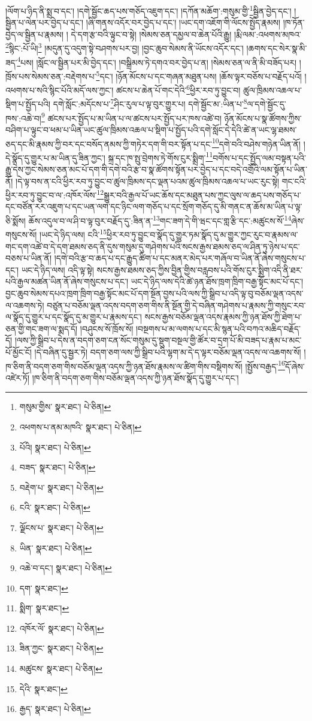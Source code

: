 །ལོག་པ་ཉིད་ནི་སྨྲ་བ་དང་། །དགེ་སྦྱོང་ཆད་པས་གཅོད་འཇུག་དང་། །དཀོན་མཆོག་:གསུམ་གྱི་\footnote{གསུམ་གྱིས་  སྣར་ཐང་།  པེ་ཅིན། }སྦྱིན་བྱེད་དང་། །སྦྱིན་པ་ལེན་པར་བྱེད་པ་དང་། །ཞི་གནས་འདོར་བར་བྱེད་པ་དང་། །ཡང་དག་འཇོག་གི་ལོངས་སྤྱོད་རྣམས། །ཁ་ཏོན་བྱེད་ལ་སྦྱིན་པ་རྣམས། །
དེ་དག་རྩ་བའི་ལྟུང་བ་སྟེ། །སེམས་ཅན་དམྱལ་བ་ཆེན་པོའི་རྒྱུ། །རྨི་ལམ་:འཕགས་མཁའ་\footnote{འཕགས་པ་ནམ་མཁའི་  སྣར་ཐང་།  པེ་ཅིན། }སྙིང་:པོ་ཡི།\footnote{པོའི།  སྣར་ཐང་།  པེ་ཅིན། } །མདུན་དུ་འདུག་སྟེ་བཤགས་པར་བྱ། །བྱང་ཆུབ་སེམས་ནི་ཡོངས་འདོར་དང་། །ཆགས་དང་སེར་སྣ་མི་ཟད་\footnote{བཟད་  སྣར་ཐང་།  པེ་ཅིན། }པས། །སློང་ལ་སྦྱིན་པར་མི་བྱེད་དང་། །བསྒྲིམས་ཏེ་དགའ་བར་བྱེད་པ་ན། །སེམས་ཅན་ལ་ནི་མི་བཟོད་པར། །ཁྲོས་པས་སེམས་ཅན་:བརྡེགས་པ་\footnote{བརྡེག་པ་  སྣར་ཐང་།  པེ་ཅིན། }དང་། །ཉོན་མོངས་པ་དང་གཞན་མཐུན་པས། །ཆོས་ལྟར་བཅོས་པ་བརྗོད་པའོ། །འཕགས་པ་སའི་སྙིང་པོའི་མདོ་ལས་ཀྱང་། ཚངས་པ་ཆེན་པོ་གང་དེའི་\footnote{ངའི་  སྣར་ཐང་།  པེ་ཅིན། }ཕྱིར་རབ་ཏུ་བྱུང་བ། ཚུལ་ཁྲིམས་འཆལ་པ་སྡིག་པ་སྤྱོད་པའི། དགེ་སློང་:མདོངས་པ་\footnote{ལྗོངས་པ་  སྣར་ཐང་།  པེ་ཅིན། }ཤིང་རུལ་པ་ལྟ་བུར་གྱུར་པ། དགེ་སྦྱོང་མ་:ཡིན་པ་\footnote{ཡིན་  སྣར་ཐང་།  པེ་ཅིན། }ལ་དགེ་སྦྱོང་དུ་ཁས་:འཆེ་བ།\footnote{འཆེ་བ་དང་།  སྣར་ཐང་།  པེ་ཅིན། } ཚངས་པར་སྤྱོད་པ་མ་ཡིན་པ་ལ་ཚངས་པར་སྤྱོད་པར་ཁས་འཚེ་བ། ཉོན་མོངས་པ་སྣ་ཚོགས་ཀྱིས་བཤིག་པ་ལྟུང་བ་ཕམ་པ་ཡིན་ཡང་ཚུལ་ཁྲིམས་འཆལ་པ་སྡིག་པ་སྤྱོད་པའི་དགེ་སློང་དེ་དེའི་ཚེ་ན་ཡང་ལྷ་ཐམས་ཅད་དང་མི་རྣམས་ཀྱི་བར་དང་བསོད་ནམས་ཀྱི་གཏེར་དག་གི་བར་སྟོན་པ་དང་\footnote{དག་  སྣར་ཐང་། }དགེ་བའི་བཤེས་གཉེན་ཡིན་ནོ། །དེ་སྣོད་དུ་གྱུར་པ་མ་ཡིན་དུ་ཟིན་ཀྱང་། སྐྲ་དང་ཁ་སྤུ་བྲེགས་ཏེ་གོས་ངུར་སྨྲིག་\footnote{སྨིག་  སྣར་ཐང་། }བགོས་པ་དང་སྤྱོད་ལམ་བསྟན་པའི་རྒྱུ་དེས་ཀྱང་སེམས་ཅན་མང་པོ་དག་གི་དགེ་བའི་རྩ་བ་སྣ་ཚོགས་སྟོན་པར་བྱེད་པ་དང་བདེ་འགྲོའི་ལམ་སྟོན་པ་ཡིན་ནོ། །དེ་ལྟ་བས་ན་ངའི་ཕྱིར་རབ་ཏུ་བྱུང་བ་ཚུལ་ཁྲིམས་དང་ལྡན་པའམ་ཚུལ་ཁྲིམས་འཆལ་པ་ཡང་རུང་སྟེ། གང་ངའི་ཕྱིར་རབ་ཏུ་བྱུང་བ་ལ་:འཁོར་ལོས་\footnote{འཁོར་ལོ་  སྣར་ཐང་།  པེ་ཅིན། }སྒྱུར་བའི་རྒྱལ་པོ་ཡང་ཆོས་དང་མཐུན་པས་ཀྱང་ལུས་ལ་ཆད་པས་གཅོད་པ་དང་བཙོན་རར་འཇུག་པ་དང་ཡན་ལག་དང་ཉིང་ལག་གཅོད་པ་དང་སྲོག་གཅོད་དུ་མི་གནང་ན་ཆོས་མ་ཡིན་པ་ལྟ་ཅི་སྨོས། ཆོས་འདུལ་བ་ལ་ཤི་བ་ལྟ་བུར་བརྗོད་དུ་:ཟིན་ན་\footnote{ཟིན་ཀྱང་  སྣར་ཐང་།  པེ་ཅིན། }གང་ཟག་དེ་གི་ཝང་དང་གླ་རྩི་དང་:མཚུངས་སོ་\footnote{མཚུངས་  སྣར་ཐང་།  པེ་ཅིན། }ཞེས་གསུངས་སོ། །ཡང་དེ་ཉིད་ལས། ངའི་\footnote{དེའི་  སྣར་ཐང་། }ཕྱིར་རབ་ཏུ་བྱུང་བ་སྣོད་དུ་གྱུར་ཏམ་སྣོད་དུ་མ་གྱུར་ཀྱང་རུང་བ་རྣམས་ལ་གང་དག་འཚེ་བ་དེ་དག་ཐམས་ཅད་ནི་དུས་གསུམ་དུ་གཤེགས་པའི་སངས་རྒྱས་ཐམས་ཅད་ལ་ཤིན་ཏུ་ཉེས་པ་དང་བཅས་པ་ཡིན་ནོ། །དགེ་བའི་རྩ་བ་ཆད་པ་དང་རྒྱུད་ཚིག་པ་དང་མནར་མེད་པར་གཞོལ་བ་ཡིན་ནོ་ཞེས་གསུངས་པ་དང་། ཡང་དེ་ཉིད་ལས། འདི་ལྟ་སྟེ། སངས་རྒྱས་ཐམས་ཅད་ཀྱིས་བྱིན་གྱིས་བརླབས་པའི་གོས་ངུར་སྨྲིག་འདི་ནི་ཐར་པའི་རྒྱལ་མཚན་ཡིན་ནོ་ཞེས་གསུངས་པ་དང་། ཡང་དེ་ཉིད་ལས་དེའི་ཚེ་ཉན་ཐོས་ཁྲག་ཁྲིག་བརྒྱ་སྟོང་མང་པོ་དང་། བྱང་ཆུབ་སེམས་དཔའ་ཁྲག་ཁྲིག་བརྒྱ་སྟོང་མང་པོ་དག་སྔོན་བྱས་པའི་ལས་ཀྱི་སྒྲིབ་པ་འདི་ལྟ་བུ་བཅོམ་ལྡན་འདས་ལ་འཆགས་ཏེ། བཙུན་པ་བཅོམ་ལྡན་འདས་བདག་ཅག་གིས་ནི་སྔོན་གྱི་དེ་བཞིན་གཤེགས་པ་རྣམས་ཀྱི་གསུང་རབ་ལ་སྣོད་དུ་གྱུར་པ་དང་སྣོད་དུ་མ་གྱུར་པ་རྣམས་དང་། སངས་རྒྱས་བཅོམ་ལྡན་འདས་རྣམས་ཀྱི་ཉན་ཐོས་ཀྱི་ཐེག་པ་ཅན་གྱི་གང་ཟག་ལ་སྨད་དོ། །བཤུངས་སོ་ཁྲོས་སོ། །བསྔགས་པ་མ་ལགས་པ་དང་མི་སྙན་པའི་བཀའ་མཆིད་བརྗོད་དོ། །ལས་ཀྱི་སྒྲིབ་པ་དེས་ན་བདག་ཅག་ངན་སོང་གསུམ་དུ་སྡུག་བསྔལ་གྱི་ཚོར་བ་དྲག་པོ་མི་བཟད་པ་རྣམ་པ་མང་པོ་མྱོང་ངོ། །དེ་བཞིན་དུ་སྦྱར་ཏེ། བདག་ཅག་ལས་ཀྱི་སྒྲིབ་པའི་ལྷག་མ་དེ་ད་ལྟར་བཅོམ་ལྡན་འདས་ལ་འཆགས་སོ། །ཁ་ཅིག་ནི་བདག་ཅག་གིས་བཅོམ་ལྡན་འདས་ཀྱི་ཉན་ཐོས་རྣམས་ལ་ཚིག་གིས་བསྡིགས་སོ། །སྤྱོས་བརྒྱད་\footnote{རྒྱད་  སྣར་ཐང་།  པེ་ཅིན། }དོ་ཞེས་འཛེར་ཏོ། །ཁ་ཅིག་ནི་བདག་ཅག་གིས་བཅོམ་ལྡན་འདས་ཀྱི་ཉན་ཐོས་སྣོད་དུ་གྱུར་པ་དང་། 